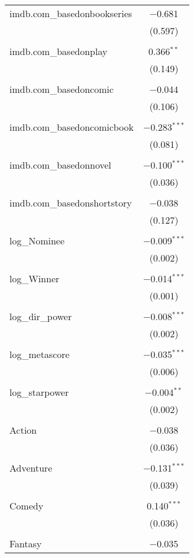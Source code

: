 \begin{table}[!htbp]
\begin{tabular}{@{\extracolsep{5pt}}lc}
 imdb.com\_basedonbookseries & $-$0.681 \\ 
  & (0.597) \\ 
  & \\ 
 imdb.com\_basedonplay & 0.366$^{**}$ \\ 
  & (0.149) \\ 
  & \\ 
 imdb.com\_basedoncomic & $-$0.044 \\ 
  & (0.106) \\ 
  & \\ 
 imdb.com\_basedoncomicbook & $-$0.283$^{***}$ \\ 
  & (0.081) \\ 
  & \\ 
 imdb.com\_basedonnovel & $-$0.100$^{***}$ \\ 
  & (0.036) \\ 
  & \\ 
 imdb.com\_basedonshortstory & $-$0.038 \\ 
  & (0.127) \\ 
  & \\ 
 log\_Nominee & $-$0.009$^{***}$ \\ 
  & (0.002) \\ 
  & \\ 
 log\_Winner & $-$0.014$^{***}$ \\ 
  & (0.001) \\ 
  & \\ 
 log\_dir\_power & $-$0.008$^{***}$ \\ 
  & (0.002) \\ 
  & \\ 
 log\_metascore & $-$0.035$^{***}$ \\ 
  & (0.006) \\ 
  & \\ 
 log\_starpower & $-$0.004$^{**}$ \\ 
  & (0.002) \\ 
  & \\ 
 Action & $-$0.038 \\ 
  & (0.036) \\ 
  & \\ 
 Adventure & $-$0.131$^{***}$ \\ 
  & (0.039) \\ 
  & \\ 
 Comedy & 0.140$^{***}$ \\ 
  & (0.036) \\ 
  & \\ 
 Fantasy & $-$0.035 \\ 

\end{tabular}
\end{table}
